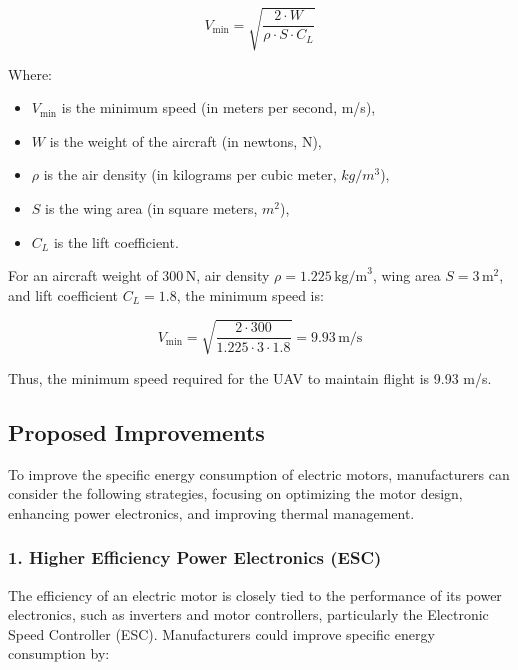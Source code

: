 \documentclass[12pt]{article}
\begin{document}
	\begin{equation}
		V_{\text{min}} = \sqrt{\frac{2 \cdot W}{\rho \cdot S \cdot C_L}}
	\end{equation}
	
	Where:
	\begin{itemize}
		\item \(V_{\text{min}}\) is the minimum speed (in meters per second, m/s),
		\item \(W\) is the weight of the aircraft (in newtons, N),
		\item \(\rho\) is the air density (in kilograms per cubic meter, \(kg/m^3\)),
		\item \(S\) is the wing area (in square meters, \(m^2\)),
		\item \(C_L\) is the lift coefficient.
	\end{itemize}
	
	For an aircraft weight of \(300 \, \text{N}\), air density \(\rho = 1.225 \, \text{kg/m}^3\), wing area \(S = 3 \, \text{m}^2\), and lift coefficient \(C_L = 1.8\), the minimum speed is:
	
	\[
	V_{\text{min}} = \sqrt{\frac{2 \cdot 300}{1.225 \cdot 3 \cdot 1.8}} = 9.93 \, \text{m/s}
	\]
	
	Thus, the minimum speed required for the UAV to maintain flight is 9.93 m/s.
	


		
		\subsection{Proposed Improvements}

		
		To improve the specific energy consumption of electric motors, manufacturers can consider the following strategies, focusing on optimizing the motor design, enhancing power electronics, and improving thermal management.
		
		\subsubsection{1. Higher Efficiency Power Electronics (ESC)}
		
		The efficiency of an electric motor is closely tied to the performance of its power electronics, such as inverters and motor controllers, particularly the Electronic Speed Controller (ESC). Manufacturers could improve specific energy consumption by:
		
\end{document}
